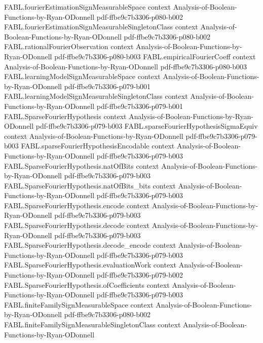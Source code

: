 \begin{theorem}
\proofstep
  {FABL.fourierEstimationSignMeasurableSpace}
  {context}
  {Analysis-of-Boolean-Functions-by-Ryan-ODonnell}
  {pdf-ffbe9c7b3306-p080-b002}
\proofstep
  {FABL.fourierEstimationSignMeasurableSingletonClass}
  {context}
  {Analysis-of-Boolean-Functions-by-Ryan-ODonnell}
  {pdf-ffbe9c7b3306-p080-b002}
\proofstep
  {FABL.rationalFourierObservation}
  {context}
  {Analysis-of-Boolean-Functions-by-Ryan-ODonnell}
  {pdf-ffbe9c7b3306-p080-b003}
\proofstep
  {FABL.empiricalFourierCoeff}
  {context}
  {Analysis-of-Boolean-Functions-by-Ryan-ODonnell}
  {pdf-ffbe9c7b3306-p080-b003}
\proofstep
  {FABL.learningModelSignMeasurableSpace}
  {context}
  {Analysis-of-Boolean-Functions-by-Ryan-ODonnell}
  {pdf-ffbe9c7b3306-p079-b001}
\proofstep
  {FABL.learningModelSignMeasurableSingletonClass}
  {context}
  {Analysis-of-Boolean-Functions-by-Ryan-ODonnell}
  {pdf-ffbe9c7b3306-p079-b001}
\proofstep
  {FABL.SparseFourierHypothesis}
  {context}
  {Analysis-of-Boolean-Functions-by-Ryan-ODonnell}
  {pdf-ffbe9c7b3306-p079-b003}
\proofstep
  {FABL.sparseFourierHypothesisSigmaEquiv}
  {context}
  {Analysis-of-Boolean-Functions-by-Ryan-ODonnell}
  {pdf-ffbe9c7b3306-p079-b003}
\proofstep
  {FABL.sparseFourierHypothesisEncodable}
  {context}
  {Analysis-of-Boolean-Functions-by-Ryan-ODonnell}
  {pdf-ffbe9c7b3306-p079-b003}
\proofstep
  {FABL.SparseFourierHypothesis.natOfBits}
  {context}
  {Analysis-of-Boolean-Functions-by-Ryan-ODonnell}
  {pdf-ffbe9c7b3306-p079-b003}
\proofstep
  {FABL.SparseFourierHypothesis.natOfBits_bits}
  {context}
  {Analysis-of-Boolean-Functions-by-Ryan-ODonnell}
  {pdf-ffbe9c7b3306-p079-b003}
\proofstep
  {FABL.SparseFourierHypothesis.encode}
  {context}
  {Analysis-of-Boolean-Functions-by-Ryan-ODonnell}
  {pdf-ffbe9c7b3306-p079-b003}
\proofstep
  {FABL.SparseFourierHypothesis.decode}
  {context}
  {Analysis-of-Boolean-Functions-by-Ryan-ODonnell}
  {pdf-ffbe9c7b3306-p079-b003}
\proofstep
  {FABL.SparseFourierHypothesis.decode_encode}
  {context}
  {Analysis-of-Boolean-Functions-by-Ryan-ODonnell}
  {pdf-ffbe9c7b3306-p079-b003}
\proofstep
  {FABL.SparseFourierHypothesis.evaluationWork}
  {context}
  {Analysis-of-Boolean-Functions-by-Ryan-ODonnell}
  {pdf-ffbe9c7b3306-p079-b002}
\proofstep
  {FABL.SparseFourierHypothesis.ofCoefficients}
  {context}
  {Analysis-of-Boolean-Functions-by-Ryan-ODonnell}
  {pdf-ffbe9c7b3306-p079-b003}
\proofstep
  {FABL.finiteFamilySignMeasurableSpace}
  {context}
  {Analysis-of-Boolean-Functions-by-Ryan-ODonnell}
  {pdf-ffbe9c7b3306-p080-b002}
\proofstep
  {FABL.finiteFamilySignMeasurableSingletonClass}
  {context}
  {Analysis-of-Boolean-Functions-by-Ryan-ODonnell}

\end{theorem}
